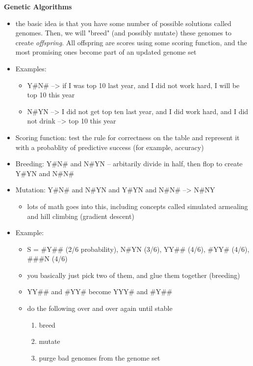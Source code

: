 \documentclass[12pt]{article}
\begin{document}
	\newpage \vfill
	\textbf{\centering Genetic Algorithms}
	\begin{itemize}
		\item the basic idea is that you have some number of possible solutions called genomes. Then, we will "breed" (and possibly mutate) these genomes to create \emph{offspring}. All offspring are scores using some scoring function, and the most promising ones become part of an updated genome set 
		\item Examples: 
		\begin{itemize}
			\item Y\#N\# --> if I was top 10 last year, and I did not work hard, I will be top 10 this year 
			\item N\#YN --> I did not get top ten last year, and I did work hard, and I did not drink --> top 10 this year
		\end{itemize}
		\item Scoring function: test the rule for correctness on the table and represent it with a probablity of predictive success (for example, accuracy)
		\item Breeding: Y\#N\# and N\#YN -- arbitarily divide in half, then flop to create Y\#YN and N\#N\#
		\item Mutation: Y\#N\# and N\#YN and Y\#YN and N\#N\# --> N\#NY 
		\begin{itemize}
			\item lots of math goes into this, including concepts called simulated armealing and hill climbing (gradient descent)
		\end{itemize}
		\item Example:
		\begin{itemize}
			\item S = {\#Y\#\# (2/6 probability), N\#YN (3/6), YY\#\# (4/6), \#YY\# (4/6), \#\#\#N (4/6)}
			\item you basically just pick two of them, and glue them together (breeding)
			\item YY\#\# and \#YY\# become YYY\# and \#Y\#\# 
			\item do the following over and over again until stable 
			\begin{enumerate}
				\item breed
				\item mutate
				\item purge bad genomes from the genome set 
			\end{enumerate}  
		\end{itemize}
	\end{itemize}
\end{document}
